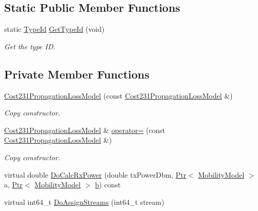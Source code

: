 \subsection*{Static Public Member Functions}
\begin{DoxyCompactItemize}
\item 
static \hyperlink{classns3_1_1TypeId}{Type\+Id} \hyperlink{classns3_1_1Cost231PropagationLossModel_aa15fc271792b23897dc536cdc2d98177}{Get\+Type\+Id} (void)
\begin{DoxyCompactList}\small\item\em Get the type ID. \end{DoxyCompactList}\end{DoxyCompactItemize}
\subsection*{Private Member Functions}
\begin{DoxyCompactItemize}
\item 
\hyperlink{classns3_1_1Cost231PropagationLossModel_a7b5f364271567402d27f3052689069a7}{Cost231\+Propagation\+Loss\+Model} (const \hyperlink{classns3_1_1Cost231PropagationLossModel}{Cost231\+Propagation\+Loss\+Model} \&)
\begin{DoxyCompactList}\small\item\em Copy constructor. \end{DoxyCompactList}\item 
\hyperlink{classns3_1_1Cost231PropagationLossModel}{Cost231\+Propagation\+Loss\+Model} \& \hyperlink{classns3_1_1Cost231PropagationLossModel_a133de9d6259634adf79860a72a0b8447}{operator=} (const \hyperlink{classns3_1_1Cost231PropagationLossModel}{Cost231\+Propagation\+Loss\+Model} \&)
\begin{DoxyCompactList}\small\item\em Copy constructor. \end{DoxyCompactList}\item 
virtual double \hyperlink{classns3_1_1Cost231PropagationLossModel_a69ee4232b70016dda215a8634349932e}{Do\+Calc\+Rx\+Power} (double tx\+Power\+Dbm, \hyperlink{classns3_1_1Ptr}{Ptr}$<$ \hyperlink{classns3_1_1MobilityModel}{Mobility\+Model} $>$ a, \hyperlink{classns3_1_1Ptr}{Ptr}$<$ \hyperlink{classns3_1_1MobilityModel}{Mobility\+Model} $>$ \hyperlink{lte__pathloss_8m_a21ad0bd836b90d08f4cf640b4c298e7c}{b}) const 
\item 
virtual int64\+\_\+t \hyperlink{classns3_1_1Cost231PropagationLossModel_a8ce452ddcb40f8fb874b6ab2db06eee7}{Do\+Assign\+Streams} (int64\+\_\+t stream)
\end{DoxyCompactItemize}
